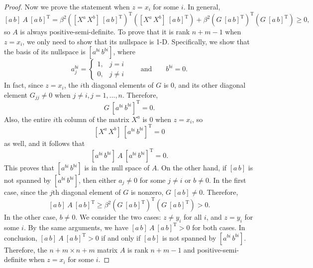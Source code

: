 \begin{proof}
Now we prove the statement when $z=x_i$ for some $i$.  In general,
\[ [a\,b]\: A\: [a\,b]^{\mathrm T} =
   \beta^2 \left([X^a\,X^b]\: [a\,b]^{\mathrm T}\right)^{\mathrm T}
   \left([X^a\,X^b]\: [a\,b]^{\mathrm T}\right) +
   \beta^2 \left(G\: [a\,b]^{\mathrm T}\right)^{\mathrm T}
   \left(G\: [a\,b]^{\mathrm T}\right) \ge 0 , \]
so $A$ is always positive-semi-definite.  To prove that it is rank $n+m-1$
when $z = x_i$, we only need to show that its nullspace is 1-D.
Specifically, we show that the basis of its nullspace is $[a^{bi}\,b^{bi}]$,
where
\[ a^{bi}_j = \begin{cases} 1, & j = i\\ 0, & j\ne i \end{cases}
   \qquad \mbox{and} \qquad b^{bi} = 0 . \]
In fact, since $z=x_i$, the $i$th diagonal elements of $G$ is 0, and its other
diagonal element $G_{jj} \ne 0$ when $j\ne i, j=1,\ldots,n$.  Therefore,
\[ G\: [a^{bi}\,b^{bi}]^{\mathrm T} = 0. \]
Also, the entire $i$th column of the matrix $X^a$ is 0 when $z=x_i$, so 
\[ [X^a\,X^b]\: [a^{bi}\,b^{bi}]^{\mathrm T} = 0 \]
as well, and it follows that
\[ [a^{bi}\,b^{bi}]\: A\: [a^{bi}\,b^{bi}]^{\mathrm T} = 0 . \]
This proves that $[a^{bi}\,b^{bi}]$ is in the null space of $A$.  On the
other hand, if $[a\,b]$ is not spanned by $[a^{bi}\,b^{bi}]$, then either
$a_j\ne 0$ for some $j\ne i$ or $b\ne 0$.  In the first case, since the $j$th
diagonal element of $G$ is nonzero, $G\:[a\,b]\ne 0$.  Therefore,
\[ [a\,b]\: A\: [a\,b]^{\mathrm T} \ge 
   \beta^2 \left(G\: [a\,b]^{\mathrm T}\right)^{\mathrm T}
   \left(G\: [a\,b]^{\mathrm T}\right) > 0 . \]
In the other case, $b\ne 0$.
We consider the two cases: $z\ne y_i$ for all $i$, and $z=y_i$ for some $i$.
By the same arguments, we have $[a\,b]\: A\: [a\,b]^{\mathrm T} > 0$ for both
cases.
In conclusion, $[a\,b]\: A\: [a\,b]^{\mathrm T} > 0$ if and only if $[a\,b]$ is
not spanned by $[a^{bi}\,b^{bi}]$.  Therefore, the $n+m \times n+m$ matrix $A$
is rank $n+m-1$ and positive-semi-definite when $z=x_i$ for some $i$.
\end{proof}


